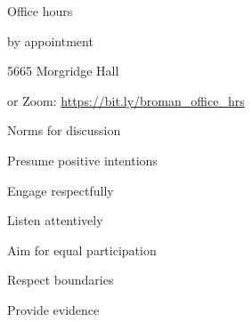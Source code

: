 \documentclass[aspectratio=169,12pt,t]{beamer}
\begin{document}
\begin{frame}{Office hours}

  \bbi
\item {\hilit by appointment}
\item 5665 Morgridge Hall
\item or Zoom: \url{https://bit.ly/broman_office_hrs}
\ei

\end{frame}






\begin{frame}{Norms for discussion}

      \bbi
    \item Presume positive intentions
    \item Engage respectfully
    \item Listen attentively
    \item Aim for equal participation
    \item Respect boundaries
    \item Provide evidence
      \ei

\end{frame}
\end{document}
